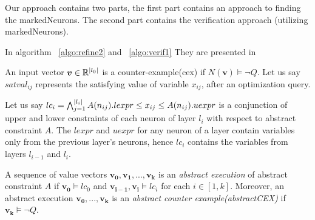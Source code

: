 Our approach contains two parts, the first part contains an approach to finding the markedNeurons. 
The second part contains the verification approach (utilizing markedNeurons).


In algorithm ~\ref{algo:refine2} and ~\ref{algo:verif1}
They are presented in 



An input vector $\boldsymbol{v} \in \mathbb{R}^{|l_0|}$ is a counter-example(cex) if $N(\boldsymbol{v}) \models \lnot Q$. 
Let us say $satval_{ij}$ represents the satisfying value of variable $x_{ij}$, after an optimization query. 







Let us say $lc_i = \bigwedge_{j=1}^{|l_i|} A(n_{ij}).lexpr \leq x_{ij} \leq  A(n_{ij}).uexpr$ is a 
conjunction of upper and lower constraints of each neuron of layer $l_i$ with respect to abstract constraint $A$.
The $lexpr$ and $uexpr$ for any neuron of a layer contain variables only from the previous layer's neurons, 
hence $lc_i$ contains the variables from layers $l_{i-1}$ and $l_i$. 

\begin{df}
  A sequence of value vectors $\boldsymbol{v_0}, \boldsymbol{v_1}, ... , \boldsymbol{v_k}$ is an 
  {\em abstract execution} of abstract constraint $A$ if 
  $\boldsymbol{v_0} \models lc_0$ and $\boldsymbol{v_{i-1}}, \boldsymbol{v_i} \models lc_i$ for each $i \in [1,k]$.  
 Moreover, an abstract execution $\boldsymbol{v_0,...,v_k}$ is
 an {\em abstract counter example(abstractCEX)} if $\boldsymbol{v_k} \models \lnot Q$.
\end{df}




